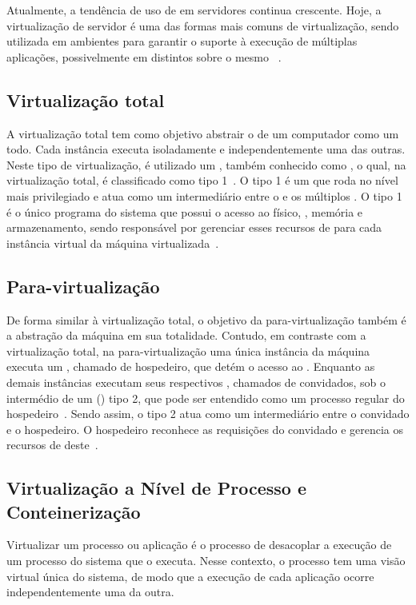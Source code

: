 Atualmente, a tendência de uso de \vms em servidores continua crescente. Hoje, a virtualização de servidor é uma das formas mais comuns de virtualização, sendo utilizada em ambientes \cloud para garantir o suporte à execução de múltiplas aplicações, possivelmente em \oss distintos sobre o mesmo \hardware~\cite{manohar2013survey}.

\subsection{Virtualização total}
A virtualização total tem como objetivo abstrair o \hardware de um computador como um todo. Cada instância executa isoladamente e independentemente uma das outras. Neste tipo de virtualização, é utilizado um \vmm, também conhecido como \hypervisor, o qual, na virtualização total, é classificado como tipo 1~\cite{campbell2006introduction}. O \hypervisor tipo 1 é um \software que roda no nível mais privilegiado e atua como um intermediário entre o \hardware e os múltiplos \sos. O \hypervisor tipo 1 é o único programa do sistema que possui o acesso ao \hardware físico, \eg \cpu, memória e armazenamento, sendo responsável por gerenciar esses recursos de \hardware para cada instância virtual da máquina virtualizada~\cite{sweeney2016virtualization}.

\subsection{Para-virtualização}
De forma similar à virtualização total, o objetivo da para-virtualização também é a abstração da máquina em sua totalidade. Contudo, em contraste com a virtualização total, na para-virtualização uma única instância da máquina executa um \so, chamado de \so hospedeiro, que detém o acesso ao \hardware. Enquanto as demais instâncias executam seus respectivos \sos, chamados de \sos convidados, sob o intermédio de um \hypervisor (\vmm) tipo 2, que pode ser entendido como um processo regular do \so hospedeiro~\cite{campbell2006introduction}. Sendo assim, o \hypervisor tipo 2 atua como um intermediário entre o \so convidado e o \so hospedeiro. O \so hospedeiro reconhece as requisições do \so convidado e gerencia os recursos de \hardware deste~\cite{sweeney2016virtualization}.

\subsection{Virtualização a Nível de Processo e Conteinerização}
Virtualizar um processo ou aplicação é o processo de desacoplar a execução de um processo do sistema que o executa. Nesse contexto, o processo tem uma visão virtual única do sistema, de modo que a execução de cada aplicação ocorre independentemente uma da outra.

